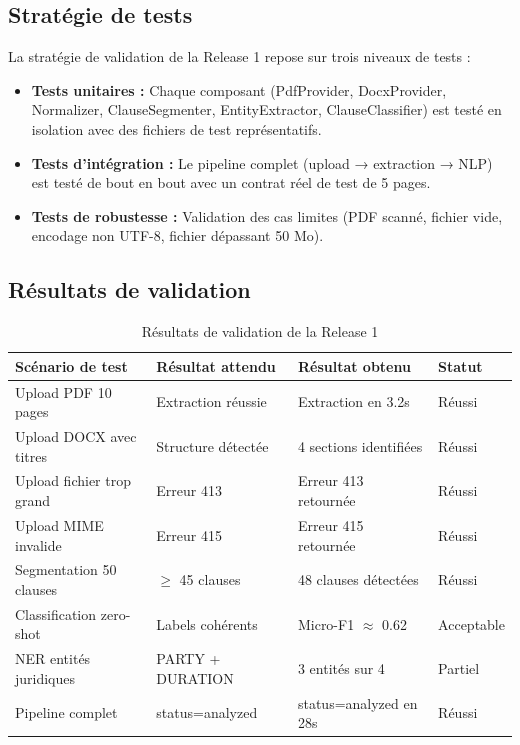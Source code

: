 \subsection{Stratégie de tests}

La stratégie de validation de la Release 1 repose sur trois niveaux de tests :

\begin{itemize}
    \item \textbf{Tests unitaires :} Chaque composant (PdfProvider, DocxProvider, Normalizer, ClauseSegmenter, EntityExtractor, ClauseClassifier) est testé en isolation avec des fichiers de test représentatifs.
    \item \textbf{Tests d'intégration :} Le pipeline complet (upload → extraction → NLP) est testé de bout en bout avec un contrat réel de test de 5 pages.
    \item \textbf{Tests de robustesse :} Validation des cas limites (PDF scanné, fichier vide, encodage non UTF-8, fichier dépassant 50 Mo).
\end{itemize}

\subsection{Résultats de validation}

\begin{table}[H]
\centering
\renewcommand{\arraystretch}{1.4}
\begin{tabular}{|p{5cm}|p{3cm}|p{3cm}|p{3cm}|}
\hline
\textbf{Scénario de test} & \textbf{Résultat attendu} & \textbf{Résultat obtenu} & \textbf{Statut} \\
\hline
Upload PDF 10 pages & Extraction réussie & Extraction en 3.2s & Réussi \\
\hline
Upload DOCX avec titres & Structure détectée & 4 sections identifiées & Réussi \\
\hline
Upload fichier trop grand & Erreur 413 & Erreur 413 retournée & Réussi \\
\hline
Upload MIME invalide & Erreur 415 & Erreur 415 retournée & Réussi \\
\hline
Segmentation 50 clauses & $\geq$ 45 clauses & 48 clauses détectées & Réussi \\
\hline
Classification zero-shot & Labels cohérents & Micro-F1 $\approx$ 0.62 & Acceptable \\
\hline
NER entités juridiques & PARTY + DURATION & 3 entités sur 4 & Partiel \\
\hline
Pipeline complet & status=analyzed & status=analyzed en 28s & Réussi \\
\hline
\end{tabular}
\caption{Résultats de validation de la Release 1}
\label{tab:tests_r1}
\end{table}

